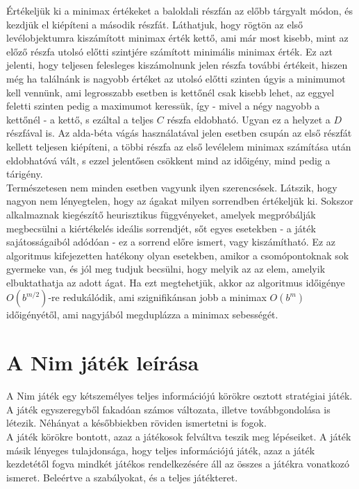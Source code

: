 Értékeljük ki a minimax értékeket a baloldali részfán az előbb tárgyalt módon, és kezdjük el kiépíteni a második részfát. Láthatjuk, hogy rögtön az első levélobjektumra kiszámított minimax érték kettő, ami már most kisebb, mint az előző részfa utolsó előtti szintjére számított minimális minimax érték. Ez azt jelenti, hogy teljesen felesleges kiszámolnunk jelen részfa további értékeit, hiszen még ha találnánk is nagyobb értéket az utolsó előtti szinten úgyis a minimumot kell vennünk, ami legrosszabb esetben is kettőnél csak kisebb lehet, az eggyel feletti szinten pedig a maximumot keressük, így - mivel a négy nagyobb a kettőnél - a kettő, s ezáltal a teljes $C$ részfa eldobható. Ugyan ez a helyzet a $D$ részfával is. Az alda-béta vágás használatával jelen esetben csupán az első részfát kellett teljesen kiépíteni, a többi részfa az első levélelem minimax számítása után eldobhatóvá vált, s ezzel jelentősen csökkent mind az időigény, mind pedig a tárigény.\\

Természetesen nem minden esetben vagyunk ilyen szerencsések. Látszik, hogy nagyon nem lényegtelen, hogy az ágakat milyen sorrendben értékeljük ki. Sokszor alkalmaznak kiegészítő heurisztikus függvényeket, amelyek megpróbálják megbecsülni a kiértékelés ideális sorrendjét, sőt egyes esetekben - a játék sajátosságaiból adódóan - ez a sorrend előre ismert, vagy kiszámítható. Ez az algoritmus kifejezetten hatékony olyan esetekben, amikor a csomópontoknak sok gyermeke van, és jól meg tudjuk becsülni, hogy melyik az az elem, amelyik elbuktathatja az adott ágat. Ha ezt megtehetjük, akkor az algoritmus időigénye $O(b^{m/2})$-re redukálódik, ami szignifikánsan jobb a minimax $O(b^m)$ időigényétől, ami nagyjából megduplázza a minimax sebességét.\\

\section{A Nim játék leírása}
A Nim játék egy kétszemélyes teljes információjú körökre osztott stratégiai játék. A játék egyszeregyből fakadóan számos változata, illetve továbbgondolása is létezik. Néhányat a későbbiekben röviden ismertetni is fogok. \\

A játék körökre bontott, azaz a játékosok felváltva teszik meg lépéseiket. A játék másik lényeges tulajdonsága, hogy teljes információjú játék, azaz a játék kezdetétől fogva mindkét játékos rendelkezésére áll az összes a játékra vonatkozó ismeret. Beleértve a szabályokat, és a teljes játékteret.\\

